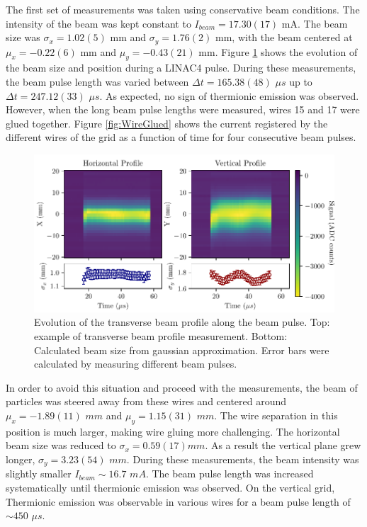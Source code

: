 The first set of measurements was taken using conservative beam conditions. The intensity of the beam was kept constant to $I_{beam} = 17.30 (17)$ mA. The beam size was $\sigma_x = 1.02(5) $ mm and $\sigma_y = 1.76(2)$ mm, with the beam centered at $\mu_x = -0.22(6)$ mm and $\mu_y = -0.43(21)$ mm. Figure \ref{fig:PulseEvol} shows the evolution of the beam size and position during a LINAC4 pulse. During these measurements, the beam pulse length was varied between $\Delta t = 165.38(48)$ $\mu s$ up to $\Delta t = 247.12(33)$ $\mu s$. As expected, no sign of thermionic emission was observed. However, when the long beam pulse lengths were measured, wires 15 and 17 were glued together. Figure \ref{fig:WireGlued} shows the current registered by the different wires of the grid as a function of time for four consecutive beam pulses. 

\begin{figure}[h]
    \centering
    \includegraphics[width=1.0\columnwidth]{Figure_BeamProfileStudy/BeamProfEvol1.pdf}
    \caption{Evolution of the transverse beam profile along the beam pulse. Top: example of transverse beam profile measurement. Bottom: Calculated beam size from gaussian approximation. Error bars were calculated by measuring different beam pulses.  }
    \label{fig:PulseEvol}
\end{figure}

In order to avoid this situation and proceed with the measurements, the beam of particles was steered away from these wires and centered around $\mu_x = -1.89(11)$  $mm$ and $\mu_y = 1.15(31)$ $mm$. The wire separation in this position is much larger, making wire gluing more challenging. The horizontal beam size was reduced to $\sigma_x = 0.59(17) mm$. As a result the vertical plane grew longer, $\sigma_y = 3.23(54)$ $mm$. During these measurements, the beam intensity was slightly smaller $I_{beam} \sim 16.7$ $mA$. The beam pulse length was increased systematically until thermionic emission was observed. On the vertical grid, Thermionic emission was observable in various wires for a beam pulse length of $\sim 450$ $\mu s$. 

